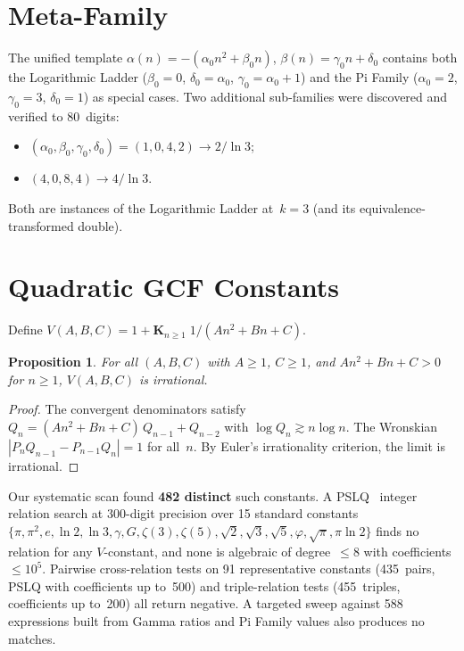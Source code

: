 \documentclass[11pt,a4paper]{article}
\theoremstyle{plain}
\newtheorem{proposition}[theorem]{Proposition}
\theoremstyle{definition}
\theoremstyle{remark}
\begin{document}
\section{Meta-Family}\label{sec:meta}

The unified template
$\alpha(n) = -(\alpha_0 n^2 + \beta_0 n)$,
$\beta(n) = \gamma_0 n + \delta_0$
contains both the Logarithmic Ladder
($\beta_0 = 0$, $\delta_0 = \alpha_0$, $\gamma_0 = \alpha_0 + 1$)
and the Pi Family
($\alpha_0 = 2$, $\gamma_0 = 3$, $\delta_0 = 1$)
as special cases.
Two additional sub-families were discovered and verified to
80~digits:
\begin{itemize}
  \item $(\alpha_0, \beta_0, \gamma_0, \delta_0) = (1,0,4,2)
    \to 2/\ln 3$;
  \item $(4,0,8,4) \to 4/\ln 3$.
\end{itemize}
Both are instances of the Logarithmic Ladder at~$k = 3$
(and its equivalence-transformed double).

\section{Quadratic GCF Constants}\label{sec:vquad}

Define $V(A,B,C) = 1 + \mathbf{K}_{n \ge 1}\; 1/(An^2 + Bn + C)$.

\begin{proposition}\label{prop:irrat}
For all $(A,B,C)$ with $A \ge 1$, $C \ge 1$, and
$An^2 + Bn + C > 0$ for $n \ge 1$, $V(A,B,C)$ is irrational.
\end{proposition}

\begin{proof}
The convergent denominators satisfy
$Q_n = (An^2{+}Bn{+}C)\,Q_{n-1} + Q_{n-2}$
with $\log Q_n \gtrsim n \log n$.
The Wronskian $|P_n Q_{n-1} - P_{n-1} Q_n| = 1$ for all~$n$.
By Euler's irrationality criterion, the limit is irrational.
\end{proof}

Our systematic scan found \textbf{482 distinct} such constants.
A PSLQ~\cite{ferguson1999} integer relation search at 300-digit precision over 15
standard constants
$\{\pi, \pi^2, e, \ln 2, \ln 3, \gamma, G, \zeta(3), \zeta(5),
\sqrt{2}, \sqrt{3}, \sqrt{5}, \varphi, \sqrt{\pi}, \pi\ln 2\}$
finds no relation for any $V$-constant, and none is algebraic of
degree~$\le 8$ with coefficients~$\le 10^5$.
Pairwise cross-relation tests on 91 representative constants
(435~pairs, PSLQ with coefficients up to~500) and triple-relation
tests (455~triples, coefficients up to~200) all return negative.
A targeted sweep against 588 expressions built from Gamma ratios
and Pi Family values also produces no matches.
\end{document}
